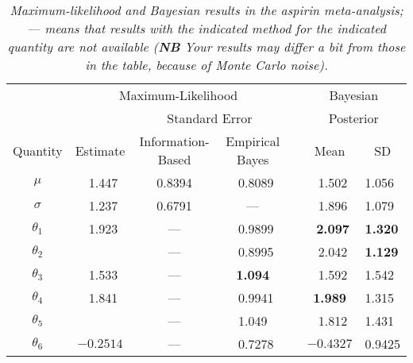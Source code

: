 \documentclass[12pt]{article}
\renewcommand{\b}[1]{\textbf{#1}}
\begin{document}
\begin{table}[t!]

\centering

\caption{\textit{Maximum-likelihood and Bayesian results in the aspirin meta-analysis; --- means that results with the indicated method for the indicated quantity are not available (\b{NB} Your results may differ a bit from those in the table, because of Monte Carlo noise).}}

\label{t:ml-bayes-comparison}

\bigskip

\begin{tabular}{c||ccc|ccl}

\multicolumn{1}{c}{} & \multicolumn{3}{c}{Maximum-Likelihood} & & \multicolumn{2}{c}{Bayesian} \\ \cline{2-4}

\multicolumn{1}{c}{} & & \multicolumn{2}{c}{Standard Error} & & \multicolumn{2}{c}{Posterior} \\ \cline{3-4} \cline{6-7}

\multicolumn{1}{c}{Quantity} & Estimate & Information-Based & \multicolumn{1}{c}{Empirical Bayes} & & Mean & \multicolumn{1}{c}{SD} \\

\hline

$\mu$ & \ 1.447 & 0.8394 & \ 0.8089 & & \ 1.502 & 1.056 \\

$\sigma$ & \ 1.237 & 0.6791 & --- & & \ 1.896 & 1.079 \\

$\theta_1$ & \ 1.923 & --- & \ 0.9899 & & \ \textbf{2.097} & \textbf{1.320} \\

$\theta_2$ & & --- & \ 0.8995 & & \ 2.042 & \textbf{1.129} \\

$\theta_3$ & \ 1.533 & --- & \textbf{1.094} & & \ 1.592 & 1.542 \\

$\theta_4$ & \ 1.841 & --- & \ 0.9941 & & \textbf{1.989} & 1.315 \\

$\theta_5$ & & --- & 1.049 & & \ 1.812 & 1.431 \\

$\theta_6$ & $-0.2514$ & --- & \ 0.7278 & & $-0.4327$ & 0.9425 \\

\end{tabular}

\end{table}
\end{document}
